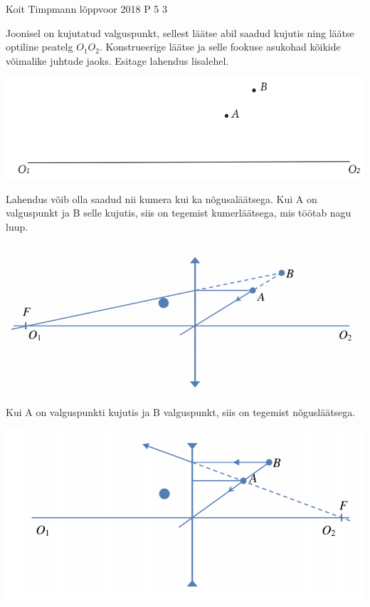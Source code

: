 {Koit Timpmann} %
{lõppvoor} %
{2018} %
{P 5} %
{3} %
{
\ifStatement
Joonisel on kujutatud valguspunkt, sellest läätse abil saadud kujutis ning läätse optiline peatelg $O_1$$O_2$. Konstrueerige läätse ja selle fookuse asukohad kõikide võimalike juhtude jaoks. Esitage lahendus lisalehel.
\begin{center}
	\includegraphics[width=0.5\linewidth]{2018-v3p-05-yl.PNG}
\end{center}
\fi
\ifHint
Lahendus võib olla saadud nii kumera kui ka nõgusaläätsega.
\fi
\ifSolution
Kui A on valguspunkt ja B selle kujutis, siis on tegemist kumerläätsega, mis töötab nagu luup.
\begin{center}
	\includegraphics[width=0.5\linewidth]{2018-v3p-05-lah1.PNG}
\end{center}
Kui A on valguspunkti kujutis ja B valguspunkt, siis on tegemist nõgusläätsega.
\begin{center}
	\includegraphics[width=0.5\linewidth]{2018-v3p-05-lah2.PNG}
\end{center}
\fi
}